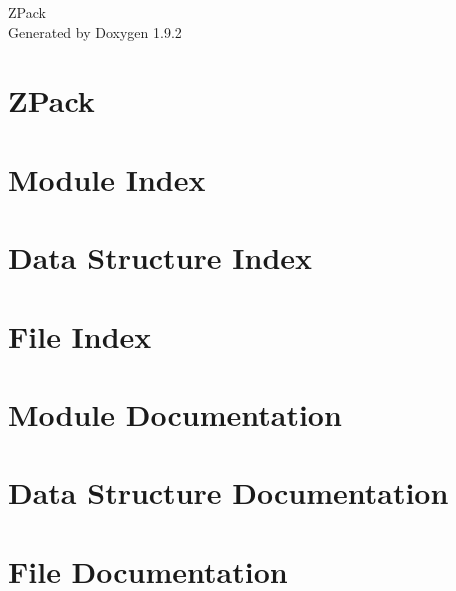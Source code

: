 \documentclass[twoside]{book}
\newcommand{\+}{\discretionary{\mbox{\scriptsize$\hookleftarrow$}}{}{}}
\newcommand{\clearemptydoublepage}{%
    \newpage{\pagestyle{empty}\cleardoublepage}%
  }
\begin{document}
  \raggedbottom
    \hypersetup{pageanchor=false,
                bookmarksnumbered=true,
                pdfencoding=unicode
               }
  \begin{titlepage}
  \vspace*{7cm}
  \begin{center}%
  {\Large ZPack}\\
  \vspace*{1cm}
  {\large Generated by Doxygen 1.9.2}\\
  \end{center}
  \end{titlepage}
  \clearemptydoublepage
  \tableofcontents
  \clearemptydoublepage
  \hypersetup{pageanchor=true}
\chapter{ZPack}
\label{index}\hypertarget{index}{}
\chapter{Module Index}

\chapter{Data Structure Index}

\chapter{File Index}

\chapter{Module Documentation}






\chapter{Data Structure Documentation}






\chapter{File Documentation}


  \backmatter
  \newpage
  \clearemptydoublepage
  \printindex
\end{document}
